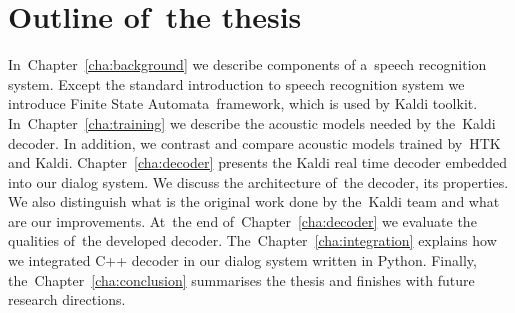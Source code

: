 

\section{Outline of~the thesis} 
\label{sec:outline_of_the_thesis}
In~Chapter~\ref{cha:background} we describe components of a~speech recognition system.  
Except the standard introduction to speech recognition system we introduce Finite State Automata~framework,
which is used by Kaldi toolkit. In~Chapter~\ref{cha:training} we describe the acoustic 
models needed by the~Kaldi decoder. 
In addition, we contrast and compare acoustic models trained by~\ac{HTK} and Kaldi. 
Chapter~\ref{cha:decoder} presents the Kaldi real time decoder embedded into our dialog system.
We discuss the architecture of~the decoder, its properties. We also distinguish what is the original work done by 
the~Kaldi team and what are our improvements. At~the end of~Chapter~\ref{cha:decoder} 
we evaluate the qualities of~the developed decoder.
The~Chapter~\ref{cha:integration} explains how we integrated C++ decoder in our dialog system written in Python.
Finally, the~Chapter~\ref{cha:conclusion} summarises the thesis and finishes with future research directions.

